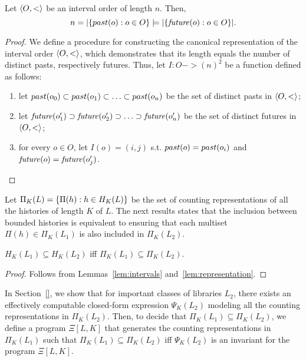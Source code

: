 \begin{lemma}
Let $\left\langle {O,<} \right\rangle$ be an interval order of length $n$. Then,
\[
n=|{\{ past({o}):o\in O \}}|=|{\{ \mathit{future}({o}):o\in O \}}|.
\]
\end{lemma}
\begin{proof}
We define a procedure for constructing the canonical representation of the interval order $\left\langle {O,<} \right\rangle$,
which demonstrates that its length equals the number of distinct pasts, respectively futures.
Thus, let $I : O -> (n)^2$ be a function defined as follows:
\begin{enumerate}

	\item let $past({o_0})\subset past({o_1})\subset \ldots\subset
past({o_n})$ be the set of distinct pasts in $\left\langle {O,<} \right\rangle$;

	\item let $\mathit{future}({o_1'})\supset \mathit{future}({o_2'})\supset \ldots\supset
\mathit{future}({o_n'})$ be the set of distinct futures in $\left\langle {O,<} \right\rangle$;

	\item for every $o\in O$, let $I(o)=(i,j)$ s.t. $past({o})=past({o_i})$ and
$\mathit{future}({o})=\mathit{future}({o_j'})$.

\end{enumerate}


\end{proof}




Let $\Pi_K(L)={\{ \Pi(h):h\in H_K(L) \}}$ be the set of counting representations of all the histories of length $K$ of $L$.
The next results states that the inclusion between bounded histories is equivalent to ensuring that each multiset 
$\Pi(h) \in \Pi_K(L_1)$ is also included in $\Pi_K(L_2)$.

\begin{lemma}

  $H_K(L_1) \subseteq H_K(L_2)$ iff $\Pi_K(L_1) \subseteq \Pi_K(L_2)$.

\end{lemma}

\begin{proof}

  Follows from Lemmas~\ref{lem:intervals} and~\ref{lem:representation}.

\end{proof}

In Section~\ref{}, we show that for important classes of libraries $L_2$, there exists an effectively computable 
closed-form expression $\Psi_K(L_2)$ modeling all the counting representations in $\Pi_K(L_2)$. 
Then, to decide that $\Pi_K(L_1) \subseteq \Pi_K(L_2)$, we define a program $\Xi[L,K]$ that generates the counting 
representations in $\Pi_K(L_1)$ such that $\Pi_K(L_1) \subseteq \Pi_K(L_2)$ iff 
$\Psi_K(L_2)$ is an invariant for the program $\Xi[L,K]$. 

